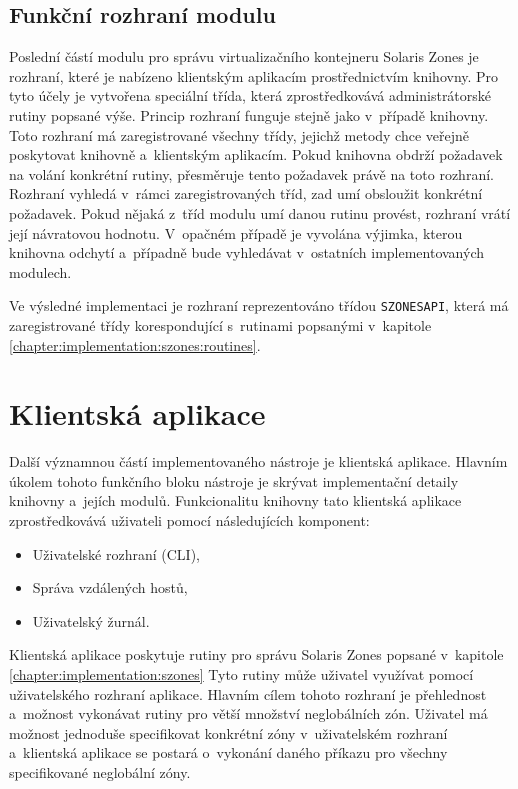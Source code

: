 \subsection{Funkční rozhraní modulu}
\label{chapter:implementation:szones:api}
Poslední částí modulu pro správu virtualizačního kontejneru Solaris Zones je rozhraní, které je nabízeno klientským aplikacím
prostřednictvím knihovny. Pro tyto účely je vytvořena speciální třída, která zprostředkovává administrátorské rutiny popsané 
výše. Princip rozhraní funguje stejně jako v~případě knihovny. Toto rozhraní má zaregistrované všechny 
třídy, jejichž metody chce veřejně poskytovat knihovně a~klientským aplikacím. Pokud knihovna obdrží požadavek na volání konkrétní
rutiny, přesměruje tento požadavek právě na toto rozhraní. Rozhraní vyhledá v~rámci zaregistrovaných tříd, zad umí obsloužit
konkrétní požadavek. Pokud nějaká z~tříd modulu umí danou rutinu provést, rozhraní vrátí její návratovou hodnotu. V~opačném případě
je vyvolána výjimka, kterou knihovna odchytí a~případně bude vyhledávat v~ostatních implementovaných modulech.

Ve výsledné implementaci je rozhraní reprezentováno třídou \verb|SZONESAPI|, která má zaregistrované třídy korespondující
s~rutinami popsanými v~kapitole \ref{chapter:implementation:szones:routines}.
\section{Klientská aplikace}
\label{chapter:implementation:client}
Další významnou částí implementovaného nástroje je klientská aplikace. Hlavním úkolem tohoto funkčního bloku nástroje je 
skrývat implementační detaily knihovny a~jejích modulů. Funkcionalitu knihovny tato klientská aplikace zprostředkovává
uživateli pomocí následujících komponent:
\begin{itemize}
 \item Uživatelské rozhraní (CLI),
 \item Správa vzdálených hostů,
 \item Uživatelský žurnál.
\end{itemize}
Klientská aplikace poskytuje rutiny pro správu Solaris Zones popsané v~kapitole \ref{chapter:implementation:szones}
Tyto rutiny může uživatel využívat pomocí uživatelského rozhraní aplikace. Hlavním cílem tohoto
rozhraní je přehlednost a~možnost vykonávat rutiny pro větší množství neglobálních zón. Uživatel má možnost jednoduše
specifikovat konkrétní zóny v~uživatelském rozhraní a~klientská aplikace se postará o~vykonání daného příkazu pro všechny
specifikované neglobální zóny.

